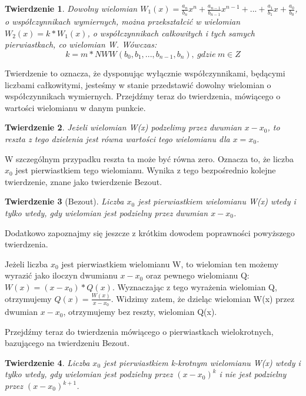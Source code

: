 \documentclass[twoside,a4paper]{book}
\newtheorem{theorem}{Twierdzenie}
\newenvironment{proof}[1][Dowód]{\begin{trivlist}
\item[\hskip \labelsep {\bfseries #1}]}{\end{trivlist}}
\begin{document}
\begin{theorem}
	Dowolny wielomian $W_1(x) = \frac{a_n}{b_n}x^n + \frac{a_{n-1}}{b_{n-1}}x^{n-1} + ... + \frac{a_1}{b_1}x + \frac{a_0}{b_0}$, o współczynnikach wymiernych, można przekształcić w wielomian $W_2(x) = k * W_1(x)$, o współczynnikach całkowitych i tych samych pierwiastkach, co wielomian W. Wówczas:
	\begin{equation}
	k = m * NWW(b_0, b_1, ..., b_{n-1}, b_n),\ gdzie\ m\in Z
	\end{equation}
\end{theorem}

Twierdzenie to oznacza, że dysponując wyłącznie współczynnikami, będącymi liczbami całkowitymi, jesteśmy w stanie przedstawić dowolny wielomian o współczynnikach wymiernych. Przejdźmy teraz do twierdzenia, mówiącego o wartości wielomianu w danym punkcie.

\begin{theorem}
	Jeżeli wielomian W(x) podzelimy przez dwumian $x - x_0$, to reszta z tego dzielenia jest równa wartości tego wielomianu dla $x = x_0$.
\end{theorem}

W szczególnym przypadku reszta ta może być równa zero. Oznacza to, że liczba $x_0$ jest pierwiastkiem tego wielomianu. Wynika z tego bezpośrednio kolejne twierdzenie, znane jako twierdzenie Bezout.

\begin{theorem}[Bezout]
	Liczba $x_0$ jest pierwiastkiem wielomianu W(x) wtedy i tylko wtedy, gdy wielomian jest podzielny przez dwumian $x - x_0$.
\end{theorem}

Dodatkowo zapoznajmy się jeszcze z krótkim dowodem poprawności powyższego twierdzenia.

\begin{proof}
	Jeżeli liczba $x_0$ jest pierwiastkiem wielomianu W, to wielomian ten możemy wyrazić jako iloczyn dwumianu $x - x_0$ oraz pewnego wielomianu Q: $W(x) = (x-x_0) * Q(x)$. Wyznaczając z tego wyrażenia wielomian Q, otrzymujemy $Q(x) = \frac{W(x)}{x-x_0}$. Widzimy zatem, że dzieląc wielomian W(x) przez dwumian $x-x_0$, otrzymujemy bez reszty, wielomian Q(x).
\end{proof}

Przejdźmy teraz do twierdzenia mówiącego o pierwiastkach wielokrotnych, bazującego na twierdzeniu Bezout.

\begin{theorem}
	Liczba $x_0$ jest pierwiastkiem k-krotnym wielomianu W(x) wtedy i tylko wtedy, gdy wielomian jest podzielny przez $(x - x_0)^k$ i nie jest podzielny przez $(x - x_0)^{k+1}$.
\end{theorem}
\end{document}

